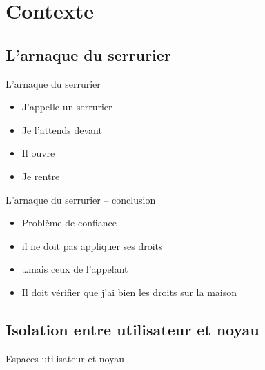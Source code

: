 \section{Contexte}

\subsection{L'arnaque du serrurier}



\begin{frame}{L'arnaque du serrurier}

\begin{itemize}
    \item J'appelle un serrurier
    \item Je l'attends devant 
    \item Il ouvre 
    \item Je rentre 
\end{itemize}
\end{frame}

\begin{frame}{L'arnaque du serrurier -- conclusion}

\begin{itemize}
\item Problème de confiance
\item il ne doit pas appliquer ses droits
\item …mais ceux de l'appelant
\item Il doit vérifier que j'ai bien les droits sur la maison
\end{itemize}

\end{frame}

\subsection{Isolation entre utilisateur et noyau}


\begin{frame}{Espaces utilisateur et noyau}
    \centering
\end{frame}

